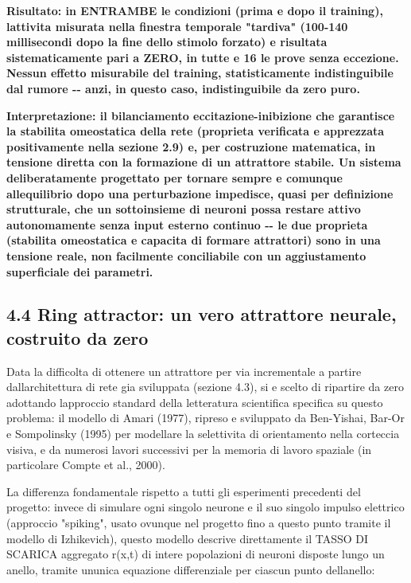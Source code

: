 \documentclass[
  italian,
]{article}
\begin{document}
\textbf{Risultato: in ENTRAMBE le condizioni (prima e dopo il training), l\textquotesingle attivita\textquotesingle{} misurata nella finestra temporale "tardiva" (100-140 millisecondi dopo la fine dello stimolo forzato) e\textquotesingle{} risultata sistematicamente pari a ZERO, in tutte e 16 le prove senza eccezione. Nessun effetto misurabile del training, statisticamente indistinguibile dal rumore -\/- anzi, in questo caso, indistinguibile da zero puro.}

\textbf{Interpretazione: il bilanciamento eccitazione-inibizione che garantisce la stabilita\textquotesingle{} omeostatica della rete (proprieta\textquotesingle{} verificata e apprezzata positivamente nella sezione 2.9) e\textquotesingle, per costruzione matematica, in tensione diretta con la formazione di un attrattore stabile. Un sistema deliberatamente progettato per tornare sempre e comunque all\textquotesingle equilibrio dopo una perturbazione impedisce, quasi per definizione strutturale, che un sottoinsieme di neuroni possa restare attivo autonomamente senza input esterno continuo -\/- le due proprieta\textquotesingle{} (stabilita\textquotesingle{} omeostatica e capacita\textquotesingle{} di formare attrattori) sono in una tensione reale, non facilmente conciliabile con un aggiustamento superficiale dei parametri.}

\subsection{4.4 Ring attractor: un vero attrattore neurale, costruito da zero}\label{ring-attractor-un-vero-attrattore-neurale-costruito-da-zero}

Data la difficolta\textquotesingle{} di ottenere un attrattore per via incrementale a partire dall\textquotesingle architettura di rete gia\textquotesingle{} sviluppata (sezione 4.3), si e\textquotesingle{} scelto di ripartire da zero adottando l\textquotesingle approccio standard della letteratura scientifica specifica su questo problema: il modello di Amari (1977), ripreso e sviluppato da Ben-Yishai, Bar-Or e Sompolinsky (1995) per modellare la selettivita\textquotesingle{} di orientamento nella corteccia visiva, e da numerosi lavori successivi per la memoria di lavoro spaziale (in particolare Compte et al., 2000).

La differenza fondamentale rispetto a tutti gli esperimenti precedenti del progetto: invece di simulare ogni singolo neurone e il suo singolo impulso elettrico (approccio "spiking", usato ovunque nel progetto fino a questo punto tramite il modello di Izhikevich), questo modello descrive direttamente il TASSO DI SCARICA aggregato r(x,t) di intere popolazioni di neuroni disposte lungo un anello, tramite un\textquotesingle unica equazione differenziale per ciascun punto dell\textquotesingle anello:
\end{document}
